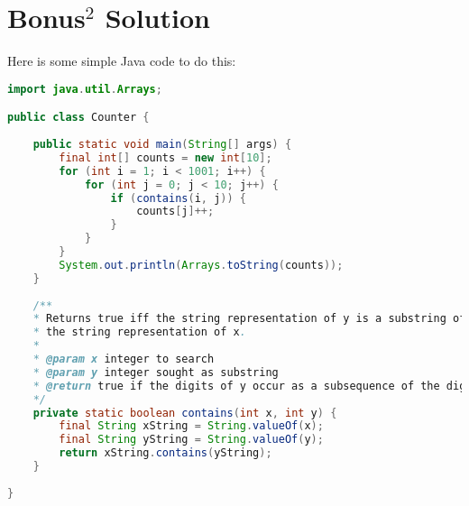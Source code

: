 \documentclass[11pt,a4paper]{report}
\theoremstyle{plain}
\theoremstyle{definition}
\theoremstyle{remark}
\begin{document}
\section*{Bonus$^2$ Solution}
Here is some simple Java code to do this:
\begin{lstlisting}[language=Java]
import java.util.Arrays;

public class Counter {
	
	public static void main(String[] args) {
		final int[] counts = new int[10];
		for (int i = 1; i < 1001; i++) {
			for (int j = 0; j < 10; j++) {
				if (contains(i, j)) {
					counts[j]++;
				}
			}
		}
		System.out.println(Arrays.toString(counts));
	}
	
	/**
	* Returns true iff the string representation of y is a substring of
	* the string representation of x.
	*
	* @param x integer to search
	* @param y integer sought as substring
	* @return true if the digits of y occur as a subsequence of the digits of x
	*/
	private static boolean contains(int x, int y) {
		final String xString = String.valueOf(x);
		final String yString = String.valueOf(y);
		return xString.contains(yString);
	}
	
}

\end{lstlisting}

 
\end{document}
